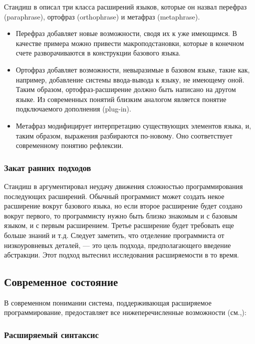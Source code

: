 \documentclass[a4paper,12pt,titlepage]{extarticle}
\begin{document}
Стандиш в \cite{Stan75} описал три класса расширений языков, которые он назвал
перефраз (paraphrase), ортофраз (orthophrase) и метафраз (metaphrase).
\begin{itemize}
  \item Перефраз добавляет новые возможности, сводя их к уже имеющимся. В
  качестве примера можно привести макроподстановки, которые в конечном счете
  разворачиваются в конструкции базового языка.
  \item Ортофраз добавляет возможности, невыразимые в базовом языке, такие как,
  например, добавление системы ввода-вывода к языку, не имеющему оной. Таким
  образом, ортофраз-расширение должно быть написано на другом языке. Из
  современных понятий близким аналогом является понятие подключаемого дополнения
  (plug-in).
  \item Метафраз модифицирует интерпретацию существующих элементов языка, и,
  таким образом, выражения разбираются по-новому. Оно соответствует
  современному понятию рефлексии.
\end{itemize}

\subsubsection*{Закат ранних подходов}

Стандиш в \cite{Stan75} аргументировал неудачу движения сложностью
программирования последующих расширений. Обычный программист может создать некое расширение вокруг базового
языка, но если второе расширение будет создано вокруг первого, то программисту
нужно быть близко знакомым и с базовым языком, и с первым расширением. Третье
расширение будет требовать еще больше знаний и т.д. Следует заметить, что
отделение программиста от низкоуровневых деталей, --- это цель подхода,
предполагающего введение абстракции. Этот подход вытеснил исследования
расширяемости в то время.

\subsection{Современное состояние}
\label{modernextsys}

В современном понимании система, поддерживающая расширяемое программирование,
предоставляет все нижеперечисленные возможности
(см.\cite{extlangwiki},\cite{Ext2105}):

\subsubsection*{Расширяемый синтаксис}
\end{document}
